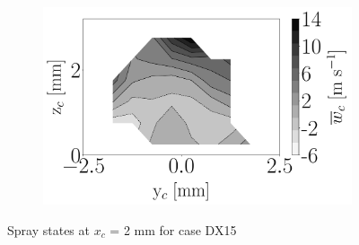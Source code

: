 \begin{figure}[h!]
\begin{subfigure}[b]{0.3\textwidth}
   \includegraphics[scale=\scaleSLIBIMER]{./part3_applications/figures_ch8_resolved/injectors_SLI/dx15_xD06p67_uz_mean_map}
\end{subfigure}
\caption{Spray states at $x_c$ = 2 mm for case DX15}
\label{fig:injectors_sli_BIMER_DX15_xD06p67}
\end{figure}
